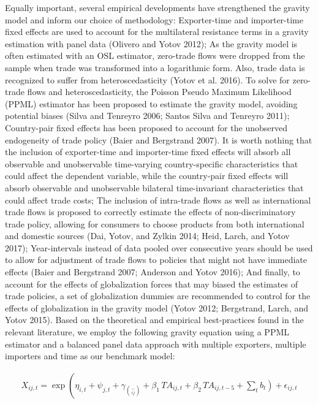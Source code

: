 Equally important, several empirical developments have strengthened the
gravity model and inform our choice of methodology: Exporter-time and
importer-time fixed effects are used to account for the multilateral
resistance terms in a gravity estimation with panel data (Olivero and
Yotov 2012); As the gravity model is often estimated with an OSL
estimator, zero-trade flows were dropped from the sample when trade was
transformed into a logarithmic form. Also, trade data is recognized to
suffer from heteroscedasticity (Yotov et al. 2016). To solve for
zero-trade flows and heteroscedasticity, the Poisson Pseudo Maximum
Likelihood (PPML) estimator has been proposed to estimate the gravity
model, avoiding potential biases (Silva and Tenreyro 2006; Santos Silva
and Tenreyro 2011); Country-pair fixed effects has been proposed to
account for the unobserved endogeneity of trade policy (Baier and
Bergstrand 2007). It is worth nothing that the inclusion of
exporter-time and importer-time fixed effects will absorb all observable
and unobservable time-varying country-specific characteristics that
could affect the dependent variable, while the country-pair fixed
effects will absorb observable and unobservable bilateral time-invariant
characteristics that could affect trade costs; The inclusion of
intra-trade flows as well as international trade flows is proposed to
correctly estimate the effects of non-discriminatory trade policy,
allowing for consumers to choose products from both international and
domestic sources (Dai, Yotov, and Zylkin 2014; Heid, Larch, and Yotov
2017); Year-intervals instead of data pooled over consecutive years
should be used to allow for adjustment of trade flows to policies that
might not have immediate effects (Baier and Bergstrand 2007; Anderson
and Yotov 2016); And finally, to account for the effects of
globalization forces that may biased the estimates of trade policies, a
set of globalization dummies are recommended to control for the effects
of globalization in the gravity model (Yotov 2012; Bergstrand, Larch,
and Yotov 2015). Based on the theoretical and empirical best-practices
found in the relevant literature, we employ the following gravity
equation using a PPML estimator and a balanced panel data approach with
multiple exporters, multiple importers and time as our benchmark model:

\begin{multline}
    X_{ij,t} = \exp\left(\eta_{i,t} + \psi_{j,t} + \gamma_{\binom{-}{ij}} + \beta_{1} \, TA_{ij,t} \right. + \beta_{2} \, TA_{ij,t-5} + \left. \sum_{t} b_{t} \right) + \epsilon_{ij,t}
\end{multline}


